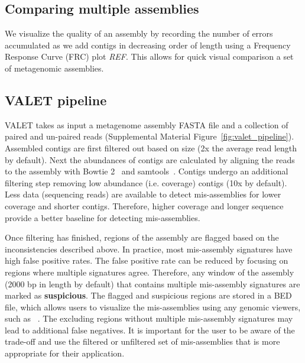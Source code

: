 \documentclass{bioinfo}
\begin{document}
\subsection{Comparing multiple assemblies}

We visualize the quality of an assembly by recording the number of errors accumulated as we add contigs in decreasing order of length using a Frequency Response Curve (FRC) plot \emph{REF}.
This allows for quick visual comparison a set of metagenomic assemblies.


\subsection{VALET pipeline}

VALET takes as input a metagenome assembly \textsc{FASTA} file and a collection of paired and un-paired reads  (Supplemental Material Figure~\ref{fig:valet_pipeline}).
Assembled contigs are first filtered out based on size (2x the average read length by default).
Next the abundances of contigs are calculated by aligning the reads to the assembly with Bowtie 2~\citep{langmead2012fast} and samtools~\citep{li2009sequence}.
Contigs undergo an additional filtering step removing low abundance (i.e. coverage) contigs (10x by default).
Less data (sequencing reads) are available to detect mis-assemblies for lower coverage and shorter contigs. 
Therefore, higher coverage and longer sequence provide a better baseline for detecting mis-assemblies.

Once filtering has finished, regions of the assembly are flagged based on the inconsistencies described above.
In practice, most mis-assembly signatures have high false positive rates.
The false positive rate can be reduced by focusing on regions where multiple signatures agree.  
Therefore, any window of the assembly (2000 bp in length by default) that contains multiple mis-assembly signatures are marked as \textbf{suspicious}.
The flagged and suspicious regions are stored in a \textsc{BED} file, which allows users to visualize the mis-assemblies using any genomic viewers, such as ~\citep{thorvaldsdottir2012integrative}.
The excluding regions without multiple mis-assembly signatures may lead to additional false negatives. It is important for the user to be aware of the trade-off and use the filtered or unfiltered set of mis-assemblies that is more appropriate for their application.
\end{document}
